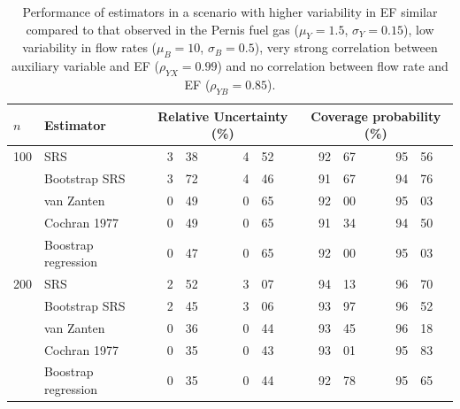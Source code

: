 \begin{table}
	\caption{Performance of estimators in a scenario with higher variability in EF similar compared to that observed in the Pernis fuel gas ($\mu_Y=1.5$, $\sigma_Y=0.15$), low variability in flow rates ($\mu_B=10$, $\sigma_B=0.5$), very strong correlation between auxiliary variable and EF ($\rho_{YX}=0.99$) and no correlation between flow rate and EF ($\rho_{YB}=0.85$).}
	\begin{tabular}{l l r@{.}l@{ - }r@{.}l r@{.}l@{ - }r@{.}l}
		\hline
		$n$ & Estimator & \multicolumn{4}{c}{Relative Uncertainty (\%)} & \multicolumn{4}{c}{Coverage probability (\%)} \\
		\hline
		100 & SRS 		 		& 3&38&4&52 & 92&67&95&56 \\
		    & Bootstrap SRS 	& 3&72&4&46 & 91&67&94&76 \\
		    & van Zanten   		& 0&49&0&65 & 92&00&95&03 \\
		    & Cochran 1977 		& 0&49&0&65 & 91&34&94&50 \\
	        & Boostrap regression & 0&47&0&65 & 92&00&95&03 \\
		\cline{2-10}
		200 & SRS 		 		& 2&52&3&07 & 94&13&96&70 \\
		    & Bootstrap SRS 	& 2&45&3&06 & 93&97&96&52 \\
		    & van Zanten   		& 0&36&0&44 & 93&45&96&18 \\
		    & Cochran 1977 		& 0&35&0&43 & 93&01&95&83 \\
		    & Boostrap regression & 0&35&0&44 & 92&78&95&65 \\
		\hline
	\end{tabular}\label{tab:batch5}
\end{table}




